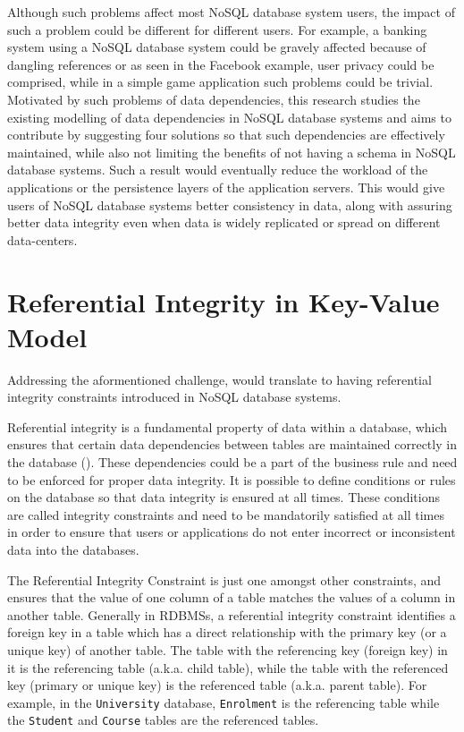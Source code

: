 Although such problems affect most \ac{NoSQL} database system users, the impact of
such a problem could be different for different users. For example, a banking
system using a \ac{NoSQL} database system could be gravely affected because of
dangling references or as seen in the Facebook example, user privacy could be
comprised, while in a simple game application such problems could be trivial.
Motivated by such problems of data dependencies, this research studies the
existing modelling of data dependencies in \ac{NoSQL} database systems and aims to
contribute by suggesting four solutions so that such dependencies are
effectively maintained, while also not limiting the benefits of not having a
schema in \ac{NoSQL} database systems. Such a result would eventually reduce the
workload of the applications or the persistence layers of the application
servers. This would give users of \ac{NoSQL} database systems better consistency in
data, along with assuring better data integrity even when data is widely
replicated or spread on different data-centers.



\section{Referential Integrity in Key-Value
Model}\label{s:referential-integrity}
Addressing the aformentioned challenge, would translate to having referential
integrity constraints introduced in \ac{NoSQL} database systems.

Referential integrity is a fundamental property of data within a database, which
ensures that certain data dependencies between tables are maintained correctly
in the database (). These dependencies could be a part of the
business rule and need to be enforced for proper data integrity. It is possible
to define conditions or rules on the database so that data integrity is ensured
at all times. These conditions are called integrity constraints and need to be
mandatorily satisfied at all times in order to ensure that users or applications
do not enter incorrect or inconsistent data into the databases.

The Referential Integrity Constraint is just one amongst other constraints, and
ensures that the value of one column of a table matches the values of a column
in another table. Generally in \acp{RDBMS}, a referential integrity constraint
identifies a foreign key in a table which has a direct relationship with the
primary key (or a unique key) of another table. The table with the
referencing key (foreign key) in it is the referencing table (a.k.a. child
table), while the table with the referenced key (primary or unique key) is the referenced table (a.k.a.
parent table). For example, in the \texttt{University} database,
\texttt{Enrolment} is the referencing table while the \texttt{Student} and \texttt{Course} tables are the referenced
tables.


